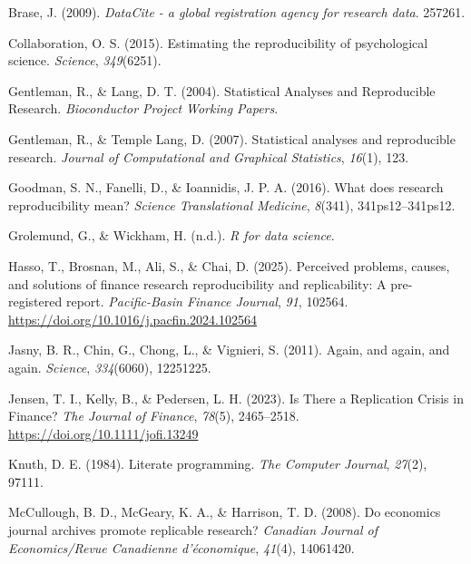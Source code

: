 \documentclass[
  a4paper,
]{article}
\newlength{\cslhangindent}
\newenvironment{CSLReferences}[2] %
 {\begin{list}{}{%
  \setlength{\itemindent}{0pt}
  \setlength{\leftmargin}{0pt}
  \setlength{\parsep}{0pt}
  \ifodd #1
   \setlength{\leftmargin}{\cslhangindent}
   \setlength{\itemindent}{-1\cslhangindent}
  \fi
  \setlength{\itemsep}{#2\baselineskip}}}
 {\end{list}}
\begin{document}
\label{refs}
\begin{CSLReferences}{1}{0}
Brase, J. (2009). \emph{DataCite - a global registration agency for
research data}. 257261.

Collaboration, O. S. (2015). Estimating the reproducibility of
psychological science. \emph{Science}, \emph{349}(6251).

Gentleman, R., \& Lang, D. T. (2004). Statistical {Analyses} and
{Reproducible Research}. \emph{Bioconductor Project Working Papers}.

Gentleman, R., \& Temple Lang, D. (2007). Statistical analyses and
reproducible research. \emph{Journal of Computational and Graphical
Statistics}, \emph{16}(1), 123.

Goodman, S. N., Fanelli, D., \& Ioannidis, J. P. A. (2016). What does
research reproducibility mean? \emph{Science Translational Medicine},
\emph{8}(341), 341ps12--341ps12.

Grolemund, G., \& Wickham, H. (n.d.). \emph{R for data science}.

Hasso, T., Brosnan, M., Ali, S., \& Chai, D. (2025). Perceived problems,
causes, and solutions of finance research reproducibility and
replicability: A pre-registered report. \emph{Pacific-Basin Finance
Journal}, \emph{91}, 102564.
\url{https://doi.org/10.1016/j.pacfin.2024.102564}

Jasny, B. R., Chin, G., Chong, L., \& Vignieri, S. (2011). Again, and
again, and again. \emph{Science}, \emph{334}(6060), 12251225.

Jensen, T. I., Kelly, B., \& Pedersen, L. H. (2023). Is There a
Replication Crisis in Finance? \emph{The Journal of Finance},
\emph{78}(5), 2465--2518. \url{https://doi.org/10.1111/jofi.13249}

Knuth, D. E. (1984). Literate programming. \emph{The Computer Journal},
\emph{27}(2), 97111.

McCullough, B. D., McGeary, K. A., \& Harrison, T. D. (2008). Do
economics journal archives promote replicable research? \emph{Canadian
Journal of Economics/Revue Canadienne d'économique}, \emph{41}(4),
14061420.


\end{CSLReferences}
\end{document}
